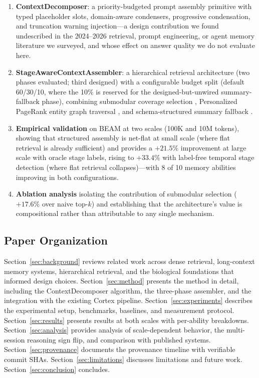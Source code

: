 \documentclass[11pt]{article}
\begin{document}
\begin{enumerate}
  \item \textbf{ContextDecomposer}: a priority-budgeted prompt
    assembly primitive with typed placeholder slots, domain-aware
    condensers, progressive condensation, and truncation warning
    injection---a design contribution we found undescribed in the
    2024--2026 retrieval, prompt engineering, or agent memory
    literature we surveyed, and whose effect on answer quality we do
    not evaluate here.

  \item \textbf{StageAwareContextAssembler}: a hierarchical
    retrieval architecture (two phases evaluated; third designed) with a configurable budget
    split (default 60/30/10, where the 10\% is reserved for the
    designed-but-unwired summary-fallback phase), combining submodular coverage selection
    \citep{Krause2008}, Personalized PageRank entity graph traversal
    \citep{Gutierrez2024}, and schema-structured summary fallback
    \citep{Tse2007}.

  \item \textbf{Empirical validation} on BEAM at two scales (100K
    and 10M tokens), showing that structured assembly is net-flat at
    small scale (where flat retrieval is already sufficient) and
    provides a $+21.5\%$ improvement at large scale with oracle
    stage labels, rising to $+33.4\%$ with label-free temporal stage
    detection (where flat retrieval collapses)---with 8 of 10 memory
    abilities improving in both configurations.

  \item \textbf{Ablation analysis} isolating the contribution of
    submodular selection ($+17.6\%$ over naive top-$k$) and
    establishing that the architecture's value is compositional
    rather than attributable to any single mechanism.
\end{enumerate}

\subsection{Paper Organization}
\label{sec:organization}

Section~\ref{sec:background} reviews related work across dense
retrieval, long-context memory systems, hierarchical retrieval, and
the biological foundations that informed design choices.
Section~\ref{sec:method} presents the method in detail, including
the ContextDecomposer algorithm, the three-phase assembler, and the
integration with the existing Cortex pipeline.
Section~\ref{sec:experiments} describes the experimental setup,
benchmarks, baselines, and measurement protocol.
Section~\ref{sec:results} presents results at both scales with
per-ability breakdowns.  Section~\ref{sec:analysis} provides
analysis of scale-dependent behavior, the multi-session reasoning
sign flip, and comparison with published systems.
Section~\ref{sec:provenance} documents the provenance timeline with
verifiable commit SHAs.  Section~\ref{sec:limitations} discusses
limitations and future work.  Section~\ref{sec:conclusion} concludes.
\end{document}
